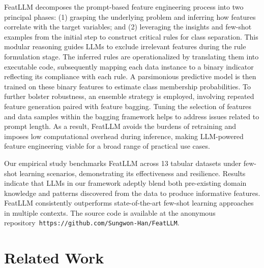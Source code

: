 \textsf{FeatLLM} decomposes the prompt-based feature engineering process into two principal phases: (1) grasping the underlying problem and inferring how features correlate with the target variables; and (2) leveraging the insights and few-shot examples from the initial step to construct critical rules for class separation. This modular reasoning guides LLMs to exclude irrelevant features during the rule formulation stage. The inferred rules are operationalized by translating them into executable code, subsequently mapping each data instance to a binary indicator reflecting its compliance with each rule. A parsimonious predictive model is then trained on these binary features to estimate class membership probabilities. To further bolster robustness, an ensemble strategy is employed, involving repeated feature generation paired with feature bagging. Tuning the selection of features and data samples within the bagging framework helps to address issues related to prompt length. As a result, \textsf{FeatLLM} avoids the burdens of retraining and imposes low computational overhead during inference, making LLM-powered feature engineering viable for a broad range of practical use cases.

Our empirical study benchmarks \textsf{FeatLLM} across 13 tabular datasets under few-shot learning scenarios, demonstrating its effectiveness and resilience. Results indicate that LLMs in our framework adeptly blend both pre-existing domain knowledge and patterns discovered from the data to produce informative features. \textsf{FeatLLM} consistently outperforms state-of-the-art few-shot learning approaches in multiple contexts. The source code is available at the anonymous repository~\texttt{https://github.com/Sungwon-Han/FeatLLM}.

\section{Related Work}

